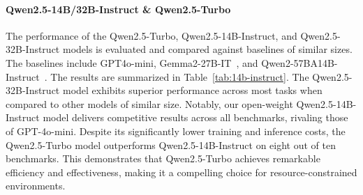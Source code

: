 \documentclass{article}
\begin{document}
\paragraph{Qwen2.5-14B/32B-Instruct \& Qwen2.5-Turbo}
The performance of the Qwen2.5-Turbo, Qwen2.5-14B-Instruct, and Qwen2.5-32B-Instruct models is evaluated and compared against baselines of similar sizes. The baselines include GPT4o-mini, Gemma2-27B-IT~\citep{gemma2}, and Qwen2-57BA14B-Instruct~\citep{qwen2}. The results are summarized in Table~\ref{tab:14b-instruct}.
The Qwen2.5-32B-Instruct model exhibits superior performance across most tasks when compared to other models of similar size. Notably, our open-weight Qwen2.5-14B-Instruct model delivers competitive results across all benchmarks, rivaling those of GPT-4o-mini.
Despite its significantly lower training and inference costs, the Qwen2.5-Turbo model outperforms Qwen2.5-14B-Instruct on eight out of ten benchmarks. This demonstrates that Qwen2.5-Turbo achieves remarkable efficiency and effectiveness, making it a compelling choice for resource-constrained environments.
\end{document}
